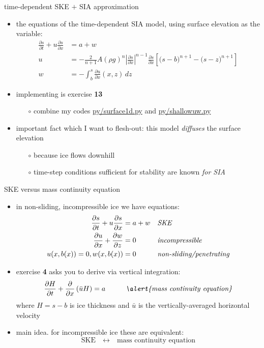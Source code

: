 \documentclass[10pt,dvipsnames]{beamer}
\begin{document}
\begin{frame}{time-dependent SKE $+$ SIA approximation}

\begin{itemize}
\item the equations of the \alert{time-dependent SIA model}, using surface elevation as the variable:
\begin{align*}
\frac{\partial s}{\partial t} + u \frac{\partial s}{\partial x} &= a + w \\
u &= - \frac{2}{n+1} A (\rho g)^n \left|\frac{\partial s}{\partial x}\right|^{n-1} \frac{\partial s}{\partial x} \left[\big(s - b\big)^{n+1} - \big(s-z\big)^{n+1}\right] \\
w &= - \int_{b}^{s} \frac{\partial u}{\partial x}(x,z)\,dz
\end{align*}
\item implementing is exercise \textbf{13}
  \begin{itemize}
  \item[$\circ$] combine my codes \href{https://github.com/bueler/mccarthy/blob/master/py/surace1d.py}{py/surface1d.py} and \href{https://github.com/bueler/mccarthy/blob/master/py/shallowuw.py}{py/shallowuw.py}
  \end{itemize}
\item important fact which I want to flesh-out: \alert{this model \emph{diffuses} the surface elevation}
  \begin{itemize}
  \item[$\circ$] because ice flows downhill
  \item[$\circ$] time-step conditions sufficient for stability are known \emph{for SIA}
  \end{itemize}
\end{itemize}
\end{frame}


\begin{frame}{SKE versus mass continuity equation}
\begin{itemize}
\item in non-sliding, incompressible ice we have equations:
\begin{align*}
\frac{\partial s}{\partial t} + u \frac{\partial s}{\partial x} &= a + w &&\text{\emph{SKE}} \\
\frac{\partial u}{\partial x} + \frac{\partial w}{\partial z} &= 0 &&\text{\emph{incompressible}} \\
u(x,b(x))=0, w(x,b(x))&=0  &&\text{\emph{non-sliding/penetrating}}
\end{align*}
\item exercise \textbf{4} asks you to derive via vertical integration:
$$\frac{\partial H}{\partial t} + \frac{\partial}{\partial x}\left(\bar u H\right) = a \hspace{10mm} \text{\emph{\alert{mass continuity equation}}}$$
where $H=s-b$ is ice thickness and $\bar u$ is the vertically-averaged horizontal velocity
\item \alert{main idea.} for incompressible ice these are equivalent:
$$\text{SKE} \quad \leftrightarrow \quad \text{mass continuity equation}$$
\end{itemize}
\end{frame}
\end{document}
